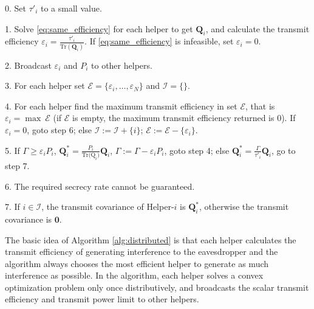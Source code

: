 \documentclass[journal]{IEEEtran}
\begin{document}
\begin{algorithm}
	\caption{}\label{alg:distributed}
	\begin{algorithmic}
		\item[0.] Set $\tau'_i$ to a small value. 
		\item[1.] Solve \eqref{eq:same_efficiency} for each helper to get $\mathbf{Q}_i$, and calculate the transmit efficiency $\varepsilon_i = \frac{\tau'_i}{\mathrm{Tr}(\mathbf{Q}_i)}$. If \eqref{eq:same_efficiency} is infeasible, set $\varepsilon_i = 0$.
		\item[2.] Broadcast $\varepsilon_i$ and $P_i$ to other helpers. 
		\item[3.] For each helper set $\mathcal{E} =\{ {\varepsilon_i,\ldots, \varepsilon_N}\}$ and $\mathcal{I} =\{\}$.
		\item[4.] For each helper find the maximum transmit efficiency in set $\mathcal{E}$, that is $\varepsilon_i = \max~\mathcal{E}$ (if $\mathcal{E}$ is empty,  the maximum transmit efficiency returned is 0). If $\varepsilon_i = 0$, goto step 6; else $\mathcal{I} := \mathcal{I} + \{i\}$; $\mathcal{E} := \mathcal{E}  - \{\varepsilon_i\}$.
		\item[5.] If $\Gamma \geq \varepsilon_{i} P_i$, $\mathbf{Q}_{i}^* = \frac{P_i}{\mathrm{Tr(\mathrm{Q}}_i)}\mathbf{Q}_i$, $\Gamma := \Gamma - \varepsilon_iP_i$, goto step 4; else $\mathbf{Q}_{i}^* = \frac{\Gamma}{\tau'_i}\mathbf{Q}_i$, go to step 7.
		\item[6.] The required secrecy rate cannot be guaranteed.
		\item[7.] If $i \in \mathcal{I}$, the transmit covariance of Helper-$i$ is $\mathbf{Q}_i^*$, otherwise the transmit covariance is $\mathbf{0}$.
		
	\end{algorithmic}
\end{algorithm}

The basic idea of Algorithm \ref{alg:distributed} is that each helper calculates the transmit efficiency of generating interference to the eavesdropper and the algorithm always chooses the most efficient helper to generate as much interference as possible. In the algorithm, each helper solves a convex optimization problem only once distributively, and broadcasts the scalar transmit efficiency and transmit power limit to other helpers. 
\end{document}
